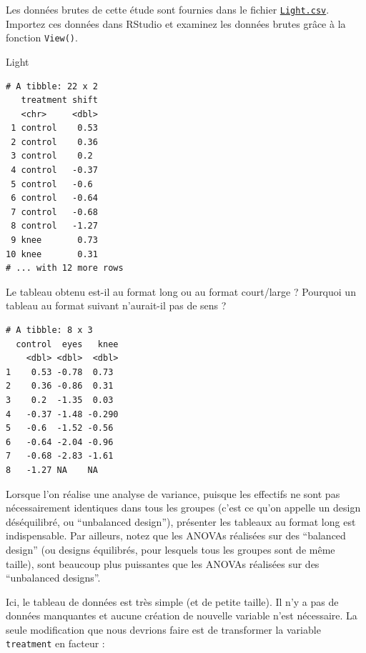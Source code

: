 \documentclass[a4paperpaper,]{article}
\newenvironment{Shaded}{\begin{snugshade}}{\end{snugshade}}
\newcommand{\DataTypeTok}[1]{\textcolor[rgb]{0.00,0.34,0.68}{#1}}
\newcommand{\KeywordTok}[1]{\textcolor[rgb]{0.12,0.11,0.11}{\textbf{#1}}}
\newcommand{\NormalTok}[1]{\textcolor[rgb]{0.12,0.11,0.11}{#1}}
\newcommand{\OperatorTok}[1]{\textcolor[rgb]{0.12,0.11,0.11}{#1}}
\newcommand{\StringTok}[1]{\textcolor[rgb]{0.75,0.01,0.01}{#1}}
\begin{document}
Les données brutes de cette étude sont fournies dans le fichier \href{https://besibo.github.io/Biometrie3/data/Light.csv}{\texttt{Light.csv}}. Importez ces données dans RStudio et examinez les données brutes grâce à la fonction \texttt{View()}.

\begin{Shaded}
\begin{Highlighting}[]
\NormalTok{Light}
\end{Highlighting}
\end{Shaded}

\begin{verbatim}
# A tibble: 22 x 2
   treatment shift
   <chr>     <dbl>
 1 control    0.53
 2 control    0.36
 3 control    0.2 
 4 control   -0.37
 5 control   -0.6 
 6 control   -0.64
 7 control   -0.68
 8 control   -1.27
 9 knee       0.73
10 knee       0.31
# ... with 12 more rows
\end{verbatim}

Le tableau obtenu est-il au format long ou au format court/large ? Pourquoi un tableau au format suivant n'aurait-il pas de sens ?

\begin{verbatim}
# A tibble: 8 x 3
  control  eyes   knee
    <dbl> <dbl>  <dbl>
1    0.53 -0.78  0.73 
2    0.36 -0.86  0.31 
3    0.2  -1.35  0.03 
4   -0.37 -1.48 -0.290
5   -0.6  -1.52 -0.56 
6   -0.64 -2.04 -0.96 
7   -0.68 -2.83 -1.61 
8   -1.27 NA    NA    
\end{verbatim}

Lorsque l'on réalise une analyse de variance, puisque les effectifs ne sont pas nécessairement identiques dans tous les groupes (c'est ce qu'on appelle un design déséquilibré, ou ``unbalanced design''), présenter les tableaux au format long est indispensable. Par ailleurs, notez que les ANOVAs réalisées sur des ``balanced design'' (ou designs équilibrés, pour lesquels tous les groupes sont de même taille), sont beaucoup plus puissantes que les ANOVAs réalisées sur des ``unbalanced designs''.

Ici, le tableau de données est très simple (et de petite taille). Il n'y a pas de données manquantes et aucune création de nouvelle variable n'est nécessaire. La seule modification que nous devrions faire est de transformer la variable \texttt{treatment} en facteur :

\begin{Shaded}
\end{Shaded}
\end{document}
